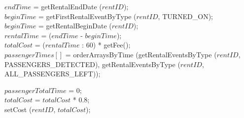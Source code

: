 \begin{algorithm}[H]
\small
	$endTime$ = {\color{blue} getRentalEndDate} ($rentID$); \\
	$beginTime$ = {\color{blue}getFirstRentalEventByType} ($rentID$, {\color{red}TURNED\_ON}); \\
	{
		$beginTime$  = {\color{blue}getRentalBeginDate} ($rentID$);\\
	}
	$rentalTime$ = ($endTime$  -  $beginTime$); \\
	$totalCost$ = ($rentalTime$ : 60) * {\color{blue}getFee}(); \\
	$passengerTimes[]$ =  {\color{blue} orderArraysByTime} ({\color{blue}getRentalEventsByType} ($rentID$, {\color{red}PASSENGERS\_DETECTED}), {\color{blue}getRentalEventsByType} ($rentID$, {\color{red}ALL\_PASSENGERS\_LEFT})); 
	
	{
		$passengerTotalTime$ = 0; \\
		{
			$totalCost$ = $totalCost$ * 0.8; \\
		} 
	}
	{\color{blue}setCost} ($rentID$, $totalCost$);
\end{algorithm}